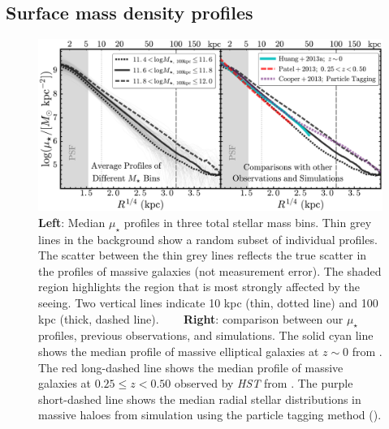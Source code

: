 \documentclass[fleqn,usenatbib]{mnras}
\def\mden{{$\mu_{\star}$}}
\begin{document}

\subsection{Surface mass density profiles}
    \label{ssec:sbp_compare}

  \begin{figure}
      \centering 
      \includegraphics[width=\textwidth]{fig/average_mass_profiles_fsps1_A}
      \caption{
          \textbf{Left}: Median \mden{} profiles in three total stellar mass bins. 
              Thin grey lines in the background show a random subset of individual
              profiles. 
              The scatter between the thin grey lines reflects the true scatter in 
              the profiles of massive galaxies (not measurement error). 
              The shaded region highlights the region that is most strongly affected 
              by the seeing. 
              Two vertical lines indicate 10 kpc (thin, dotted line) and
              100 kpc (thick, dashed line). ~~~ 
          \textbf{Right}: comparison between our \mden{} profiles, previous observations, 
              and simulations. 
              The solid cyan line shows the median profile of massive elliptical 
              galaxies at $z{\sim} 0$ from \citet[][]{Huang2013a}. 
              The red long-dashed line shows the median profile of massive galaxies at 
              $0.25 \leq z < 0.50$ observed by \textit{HST} from \citet[][]{Patel2013}. 
              The purple short-dashed line shows the median radial stellar distributions 
              in massive haloes from simulation using the particle tagging method
              (\citealt{Cooper2013}).}
      \label{fig:avg_prof}
  \end{figure}
\end{document}
